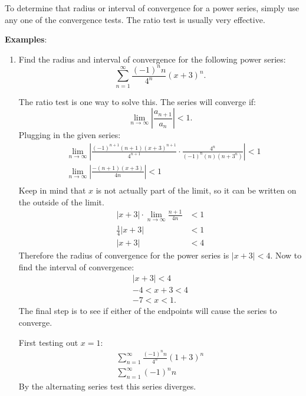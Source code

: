 \documentclass[12pt]{article}
\begin{document}
                To determine that radius or interval of convergence for a power series, simply use any one of the convergence tests. The ratio test is usually very effective.

                \noindent \textbf{Examples}:
                \begin{enumerate}
                    \item Find the radius and interval of convergence for the following power series:
                    \[ \sum_{n=1}^\infty \frac{(-1)^n n}{4^n} (x+3)^n. \]

                    The ratio test is one way to solve this. The series will converge if:
                    \[ \lim_{n \to \infty} \left| \frac{a_{n+1}}{a_n} \right| < 1. \]
                    Plugging in the given series:
                    \begin{align*}
                        &\lim_{n \to \infty} \left| \frac{(-1)^{n+1}(n+1)(x+3)^{n+1}}{4^{n+1}} \cdot \frac{4^n}{(-1)^n (n)(n+3^n)} \right| < 1 \\[6pt]
                        &\lim_{n \to \infty} \left| \frac{-(n+1)(x+3)}{4n} \right| < 1 \\[6pt]
                    \end{align*}
                    Keep in mind that $x$ is not actually part of the limit, so it can be written on the outside of the limit.
                    \begin{align*}
                        |x+3| \cdot \lim_{n \to \infty} \frac{n+1}{4n} &< 1 \\[6pt]
                        \frac{1}{4} |x+3| &< 1 \\[6pt]
                        |x+3| &< 4
                    \end{align*}
                    Therefore the radius of convergence for the power series is $|x+3| < 4$. Now to find the interval of convergence:
                    \begin{gather*}
                        |x+3| < 4 \\
                        -4 < x+3 < 4 \\
                        -7 < x < 1.
                    \end{gather*}
                    The final step is to see if either of the endpoints will cause the series to converge.

                    First testing out $x=1$:
                    \begin{gather*}
                        \sum_{n=1}^\infty \frac{(-1)^n n}{4^n} (1+3)^n \\[6pt]
                        \sum_{n=1}^\infty (-1)^n n
                    \end{gather*}
                    By the alternating series test this series diverges.


\end{enumerate}
\end{document}
